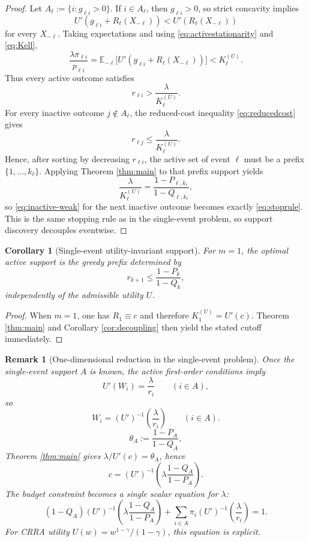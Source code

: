 \documentclass[11pt]{article}
\newtheorem{corollary}[theorem]{Corollary}
\newtheorem{remark}[theorem]{Remark}
\newcommand{\E}{\mathbb{E}}
\begin{document}
\begin{proof}
Let $A_\ell:=\{i:g_{\ell i}>0\}$. If $i\in A_\ell$, then $g_{\ell i}>0$, so strict concavity implies
\[
  U'(g_{\ell i}+R_\ell(X_{-\ell}))<U'(R_\ell(X_{-\ell}))
\]
for every $X_{-\ell}$. Taking expectations and using \eqref{eq:activestationarity} and \eqref{eq:Kell},
\[
  \frac{\lambda\pi_{\ell i}}{p_{\ell i}}
  =\E_{-\ell}\bigl[U'(g_{\ell i}+R_\ell(X_{-\ell}))\bigr]
  < K_\ell^{(U)}.
\]
Thus every active outcome satisfies
\begin{equation}\label{eq:active-strict}
  r_{\ell i}>\frac{\lambda}{K_\ell^{(U)}}.
\end{equation}
For every inactive outcome $j\notin A_\ell$, the reduced-cost inequality \eqref{eq:reducedcost} gives
\begin{equation}\label{eq:inactive-weak}
  r_{\ell j}\le \frac{\lambda}{K_\ell^{(U)}}.
\end{equation}
Hence, after sorting by decreasing $r_{\ell i}$, the active set of event $\ell$ must be a prefix $\{1,\dots,k_\ell\}$. Applying Theorem \ref{thm:main} to that prefix support yields
\[
  \frac{\lambda}{K_\ell^{(U)}}=\frac{1-P_{\ell,k_\ell}}{1-Q_{\ell,k_\ell}},
\]
so \eqref{eq:inactive-weak} for the next inactive outcome becomes exactly \eqref{eq:stoprule}. This is the same stopping rule as in the single-event problem, so support discovery decouples eventwise.
\end{proof}

\begin{corollary}[Single-event utility-invariant support]\label{cor:singleevent}
For $m=1$, the optimal active support is the greedy prefix determined by
\[
  r_{k+1}\le \frac{1-P_k}{1-Q_k},
\]
independently of the admissible utility $U$.
\end{corollary}

\begin{proof}
When $m=1$, one has $R_1\equiv c$ and therefore $K_1^{(U)}=U'(c)$. Theorem \ref{thm:main} and Corollary \ref{cor:decoupling} then yield the stated cutoff immediately.
\end{proof}

\begin{remark}[One-dimensional reduction in the single-event problem]\label{rem:scalar}
Once the single-event support $A$ is known, the active first-order conditions imply
\[
  U'(W_i)=\frac{\lambda}{r_i} \qquad (i\in A),
\]
so
\[
  W_i=(U')^{-1}\!\left(\frac{\lambda}{r_i}\right) \qquad (i\in A).
\]
\[
  \theta_A:=\frac{1-P_A}{1-Q_A},
\]
Theorem \ref{thm:main} gives $\lambda/U'(c)=\theta_A$, hence
\[
  c=(U')^{-1}\!\left(\lambda\frac{1-Q_A}{1-P_A}\right).
\]
The budget constraint becomes a single scalar equation for $\lambda$:
\[
  (1-Q_A)(U')^{-1}\!\left(\lambda\frac{1-Q_A}{1-P_A}\right)
  +\sum_{i\in A}\pi_i (U')^{-1}\!\left(\frac{\lambda}{r_i}\right)=1.
\]
For CRRA utility $U(w)=w^{1-\gamma}/(1-\gamma)$, this equation is explicit.
\end{remark}
\end{document}
